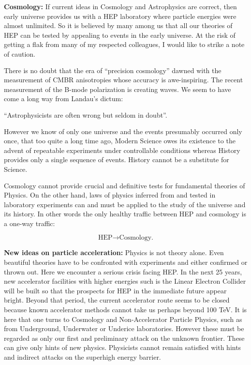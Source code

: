\textbf{Cosmology:} If current ideas in Cosmology and Astrophysics are correct,
then early universe provides us with a HEP laboratory where particle energies
were almost unlimited. So it is believed by many among us that all our
theories of HEP can be tested by appealing to events in the early universe.
At the risk of getting a flak from many of my respected colleagues, I would
like to strike a note of caution. 


There is no doubt that the era of ``precision cosmology” dawned with the
measurement of CMBR anisotropies whose accuracy is awe-inspiring. The
recent measurement of the B-mode polarization is creating waves. We seem
to have come a long way from Landau’s dictum: 

{\centering “Astrophysicists are often wrong but seldom in doubt”.} 


However we know of only one universe and the events presumably occurred only once, that too quite a long time ago, Modern Science owes its
existence to the advent of repeatable experiments under controllable conditions whereas History provides only a single sequence of events. History
cannot be a substitute for Science. 

Cosmology cannot provide crucial and definitive tests for fundamental
theories of Physics. On the other hand, laws of physics inferred from and
tested in laboratory experiments can and must be applied to the study of
the universe and its history. In other words the only healthy traffic between
HEP and cosmology is a one-way traffic: 

$$
\text{HEP} \rightarrow \text{Cosmology.} 
$$

\textbf{New ideas on particle acceleration:} Physics is not theory alone.
Even beautiful theories have to be confronted with experiments and either
confirmed or thrown out. Here we encounter a serious crisis facing HEP. In
the next 25 years, new accelerator facilities with higher energies such is the
Linear Electron Collider will be built so that the prospects for HEP in the
immediate future appear bright. Beyond that period, the current accelerator
route seems to be closed because known accelerator methods cannot take
us perhaps beyond 100 TeV. It is here that one turns to Cosmology and
Non-Accelerator Particle Physics, such as from Underground, Underwater or
Underice laboratories. However these must be regarded as only our first and
preliminary attack on the unknown frontier. These can give only hints of new
physics. Physicists cannot remain satisfied with hints and indirect attacks
on the superhigh energy barrier. 



